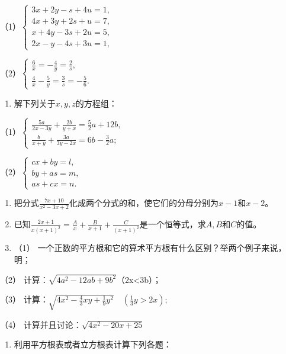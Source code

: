 （1）\(\left\{ \begin{array}{l} 3x + 2y - s + 4u = 1, \\ 4x + 3y + 2s + u = 7, \\ x + 4y - 3s + 2u = 5, \\ 2x - y - 4s + 3u = 1, \end{array} \right.\)

（2）\(\left\{ \begin{array}{l} \frac{6}{x} = -\frac{4}{y} = \frac{2}{s}, \\ \frac{4}{x} - \frac{5}{y} = \frac{3}{s} = -\frac{5}{6}. \end{array} \right.\)

\begin{enumerate}[start=17]
\item
  解下列关于\(x, y, z\)的方程组：
\end{enumerate}

（1）\(\left\{ \begin{array}{l} \frac{5a}{2x - 3y} + \frac{2b}{y + x} = \frac{5}{2} a + 12b, \\ \frac{b}{x + y} + \frac{3a}{3y - 2x} = 6b - \frac{3}{2} a; \end{array} \right.\)

（2）\(\left\{ \begin{array}{l} cx + by = l, \\ by + as = m, \\ as + cx = n. \end{array} \right.\)

\begin{enumerate}[start=18]
\item
  把分式\(\frac{7x + 10}{x^2 - 3x + 2}\)化成两个分式的和，使它们的分母分别为\(x - 1\)和\(x - 2\)。
\item
  已知\(\frac{2x + 1}{x(x + 1)^2} = \frac{A}{x} + \frac{B}{x + 1} + \frac{C}{(x + 1)^2}\)是一个恒等式，求\(A, B\)和\(C\)的值。
\item
  （1） 一个正数的平方根和它的算术平方根有什么区别？举两个例子来说，明；
\end{enumerate}

（2） 计算：\(\sqrt{4a^{2}-12ab+9b^{2}}\)（2x\textless3b）；

（3）
计算：\(\sqrt{4x^{2}-\frac{4}{3}xy+\frac{1}{9}y^{2}}\quad\left(\frac{1}{3}y>2x\right);\)

（4） 计算并且讨论：\(\sqrt{4x^{2}-20x+25}\)

\begin{enumerate}[start=21]
\item
  利用平方根表或者立方根表计算下列各题：
\end{enumerate}

